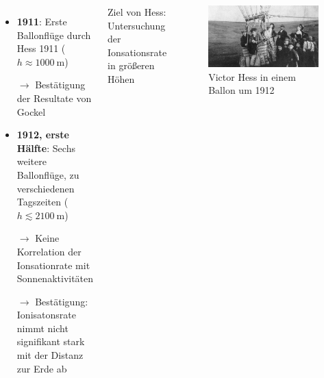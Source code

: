 \documentclass[aspectratio=1610, professionalfonts, 9pt, hyperref={colorlinks=false}]{beamer}
\begin{document}
\begin{frame}{}
  \begin{columns}
      \begin{itemize}
        \setlength\itemsep{0.5em}
        \item \textbf{1911}: Erste Ballonflüge durch Hess 1911 ($h \approx \SI{1000}{\metre}$)
        \item [$\rightarrow$] Bestätigung der Resultate von Gockel
        \item \textbf{1912, erste Hälfte}: Sechs weitere Ballonflüge, zu verschiedenen Tagszeiten ($h \lesssim \SI{2100}{\metre}$)
        \item [$\rightarrow$] Keine Korrelation der Ionsationrate mit Sonnenaktivitäten
        \item [$\rightarrow$] Bestätigung: Ionisatonsrate nimmt nicht signifikant stark mit der Distanz zur Erde ab
      \end{itemize}
        \vspace*{10px}

    Ziel von Hess: Untersuchung der Ionsationsrate in größeren Höhen
  
      \begin{figure}
          \centering
          \includegraphics[width=\linewidth]{images/ballon.jpg}
          \caption{Victor Hess in einem Ballon um 1912 \cite{baloon}}
      \end{figure}
  \end{columns}
\end{frame}
\end{document}
